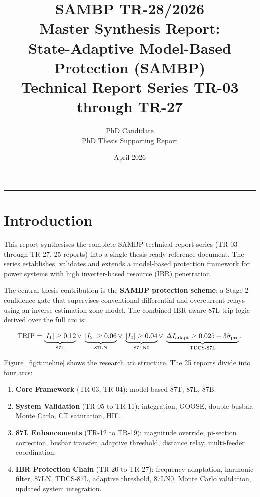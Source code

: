 \documentclass[11pt,a4paper]{article}
\title{%
  \textbf{SAMBP TR-28/2026}\\[4pt]
  Master Synthesis Report:\\
  State-Adaptive Model-Based Protection (SAMBP)\\
  Technical Report Series TR-03 through TR-27}
\author{PhD Candidate\\PhD Thesis Supporting Report}
\date{April 2026}
\begin{document}
\maketitle
\tableofcontents
\vspace{6pt}\hrule\vspace{10pt}

\section{Introduction}

This report synthesises the complete SAMBP technical report series
(TR-03 through TR-27, 25 reports) into a single thesis-ready reference
document.  The series establishes, validates and extends a model-based
protection framework for power systems with high inverter-based resource
(IBR) penetration.

The central thesis contribution is the \textbf{SAMBP protection scheme}:
a Stage-2 confidence gate that supervises conventional differential and
overcurrent relays using an inverse-estimation zone model.  The combined
IBR-aware 87L trip logic derived over the full arc is:

\begin{equation}
  \text{TRIP} =
    \underbrace{|I_1| \geq 0.12}_{\text{87L}}
    \vee\;
    \underbrace{|I_2| \geq 0.06}_{\text{87LN}}
    \vee\;
    \underbrace{|I_0| \geq 0.04}_{\text{87LN0}}
    \vee\;
    \underbrace{\Delta I_{\rm adapt} \geq
      0.025 + 3\hat{\sigma}_{\rm pre}}_{\text{TDCS-87L}}.
  \label{eq:combined_final}
\end{equation}

Figure~\ref{fig:timeline} shows the research arc structure.
The 25 reports divide into four arcs:

\begin{enumerate}
  \item[\textcolor{arc1col}{\textbf{Arc 1}}]
    \textbf{Core Framework} (TR-03, TR-04): model-based 87T, 87L, 87B.
  \item[\textcolor{arc2col}{\textbf{Arc 2}}]
    \textbf{System Validation} (TR-05 to TR-11): integration,
    GOOSE, double-busbar, Monte Carlo, CT saturation, HIF.
  \item[\textcolor{arc3col}{\textbf{Arc 3}}]
    \textbf{87L Enhancements} (TR-12 to TR-19): magnitude override,
    pi-section correction, busbar transfer, adaptive threshold,
    distance relay, multi-feeder coordination.
  \item[\textcolor{arc4col}{\textbf{Arc 4}}]
    \textbf{IBR Protection Chain} (TR-20 to TR-27): frequency adaptation,
    harmonic filter, 87LN, TDCS-87L, adaptive threshold, 87LN0,
    Monte Carlo validation, updated system integration.
\end{enumerate}
\end{document}
